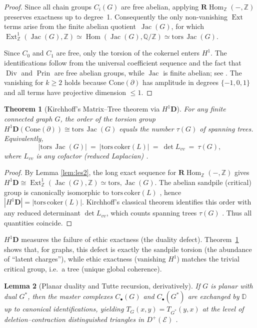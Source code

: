 \documentclass[12pt]{article}
\DeclareMathOperator{\Div}{Div}
\DeclareMathOperator{\Prin}{Prin}
\DeclareMathOperator{\Jac}{Jac}
\newcommand{\E}{\mathcal{E}}
\newcommand{\ZZ}{\mathbb{Z}}
\newcommand{\QQ}{\mathbb{Q}}
\newcommand{\DD}{\mathbb{D}}
\newcommand{\Hom}{\operatorname{Hom}}
\newcommand{\Ext}{\operatorname{Ext}}
\newcommand{\RHom}{\mathbf{R}\!\operatorname{Hom}}
\newcommand{\Dplus}{D^{+}}
\theoremstyle{plain}
\newtheorem{theorem}{Theorem}[section]
\newtheorem{lemma}[theorem]{Lemma}
\theoremstyle{definition}
\theoremstyle{remark}
\numberwithin{equation}{section}
\begin{document}
\begin{proof}
Since all chain groups $C_i(G)$ are free abelian, applying
$\RHom_\ZZ(-,\ZZ)$ preserves exactness up to degree~1.
Consequently the only non-vanishing $\Ext$ terms arise from the
finite abelian quotient~$\Jac(G)$, for which
$\Ext^1_\ZZ(\Jac(G),\ZZ)\simeq\Hom(\Jac(G),\QQ/\ZZ)
\simeq\mathrm{tors}\,\Jac(G)$.

Since $C_0$ and $C_1$ are free, only the torsion of the cokernel enters $H^1$. The identifications follow from the universal coefficient sequence and the fact that $\Div$ and $\Prin$ are free abelian groups, while $\Jac$ is finite abelian; see \cite{Weibel1994}. The vanishing for $k\ge 2$ holds because $\mathrm{Cone}(\partial)$ has amplitude in degrees $\{-1,0,1\}$ and all terms have projective dimension $\le 1$.
\end{proof}

\begin{theorem}[Kirchhoff's Matrix–Tree theorem via $H^1\mathbf D$]\label{thm:kirchhoff}
For any finite connected graph $G$, the order of the torsion group $H^1\mathbf D(\mathrm{Cone}(\partial))\cong \mathrm{tors}\,\Jac(G)$ equals the number $\tau(G)$ of spanning trees. Equivalently,
\[
|\mathrm{tors}\,\Jac(G)|\ =\ |\mathrm{tors}\,\mathrm{coker}(L)|\ =\ \det L_{vv}\ =\ \tau(G),
\]
where $L_{vv}$ is any cofactor (reduced Laplacian) \cite{Kirchhoff1847,Biggs1993}.
\end{theorem}

\begin{proof}
By Lemma \ref{lem:les2}, the long exact sequence for $\RHom_\ZZ(-,\ZZ)$ gives $H^1\mathbf D\cong\Ext^1_\ZZ(\Jac(G),\ZZ)\simeq\mathrm{tors},\Jac(G)$. The abelian sandpile (critical) group is canonically isomorphic to $\mathrm{tors}\,\mathrm{coker}(L)$ \cite{Dhar1990}, hence $|H^1\mathbf D|=|\mathrm{tors}\,\mathrm{coker}(L)|$. Kirchhoff's classical theorem identifies this order with any reduced determinant $\det L_{vv}$, which counts spanning trees $\tau(G)$ \cite{Biggs1993}. Thus all quantities coincide.
\end{proof}

$H^1\mathbf D$ measures the failure of ethic exactness (the duality defect). Theorem~\ref{thm:kirchhoff} shows that, for graphs, this defect is exactly the sandpile torsion (the abundance of “latent charges”), while ethic exactness (vanishing $H^1$) matches the trivial critical group, i.e.\ a tree (unique global coherence).

\begin{lemma}[Planar duality and Tutte recursion, derivatively]
If $G$ is planar with dual $G^\ast$, then the master complexes $C_\bullet(G)$ and $C_\bullet(G^\ast)$ are exchanged by $\DD$ up to canonical identifications, yielding $T_G(x,y)=T_{G^\ast}(y,x)$ at the level of deletion–contraction distinguished triangles in $\Dplus(\E)$ \cite{Tutte1954,Biggs1993}.
\end{lemma}
\end{document}
